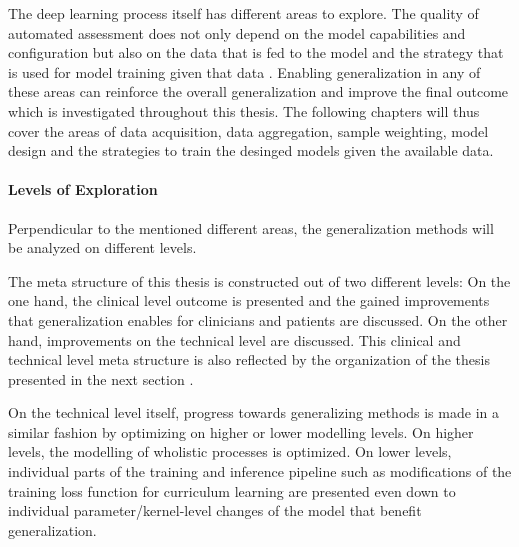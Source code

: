            The deep learning process itself has different areas to explore.
            The quality of automated assessment does not only depend on the model capabilities and configuration but also on the data that is fed to the model and the strategy that is used for model training given that data \citep{soviany2022curriculum}.
            Enabling generalization in any of these areas can reinforce the overall generalization and improve the final outcome which is investigated throughout this thesis. The following chapters will thus cover the areas of data acquisition, data aggregation, sample weighting, model design and the strategies to train the desinged models given the available data.

        \paragraph{Levels of Exploration}
            Perpendicular to the mentioned different areas, the generalization methods will be analyzed on different levels.

            The meta structure of this thesis is constructed out of two different levels: On the one hand, the clinical level outcome is presented and the gained improvements that generalization enables for clinicians and patients are discussed.
            On the other hand, improvements on the technical level are discussed.
            This clinical and technical level meta structure is also reflected by the organization of the thesis presented in the next section .

            On the technical level itself, progress towards generalizing methods is made in a similar fashion by optimizing on higher or lower modelling levels.
            On higher levels, the modelling of wholistic processes is optimized. On lower levels, individual parts of the training and inference pipeline such as modifications of the training loss function for curriculum learning are presented even down to individual parameter/kernel-level changes of the model that benefit generalization.


